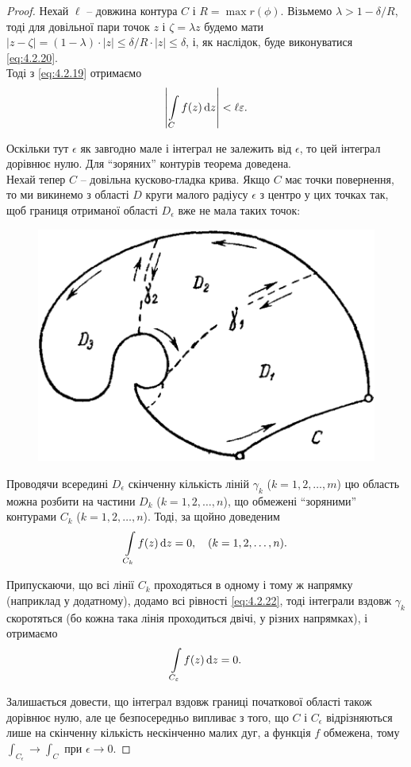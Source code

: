 \begin{proof}
	Нехай $\ell$ -- довжина контура $C$ і $R = \max r(\phi)$. Візьмемо $\lambda > 1 - \delta / R$, тоді для довільної пари точок $z$ і $\zeta = \lambda z$ будемо мати $|z - \zeta| = (1 - \lambda) \cdot |z| \le \delta / R \cdot |z| \le \delta$, і, як наслідок, буде виконуватися \eqref{eq:4.2.20}. \\

	Тоді з \eqref{eq:4.2.19} отримаємо
	\begin{equation}
		\label{eq:4.2.21}
		\left|\displaystyle\int\limits_C f(z)\mathop{}\!\mathrm{d} z\right| < \ell \varepsilon.
	\end{equation}

	Оскільки тут $\epsilon$ як завгодно мале і інтеграл не залежить від $\epsilon$, то цей інтеграл дорівнює нулю. Для ``зоряних'' контурів теорема доведена. \\

	Нехай тепер $C$ -- довільна кусково-гладка крива. Якщо $C$ має точки повернення, то ми викинемо з області $D$ круги малого радіусу $\epsilon$ з центро у цих точках так, щоб границя отриманої області $D_\epsilon$ вже не мала таких точок:
	\begin{figure}[H]
		\centering
		\includegraphics[width=.4\linewidth]{mal-20.png}
	\end{figure}

	Проводячи всередині $D_\epsilon$ скінченну кількість ліній $\gamma_k$ ($k=1,2,\ldots,m$) цю область можна розбити на частини $D_k$ ($k=1,2,\ldots,n$), що обмежені ``зоряними'' контурами $C_k$ ($k=1,2,\ldots,n$). Тоді, за щойно доведеним
	\begin{equation}
		\label{eq:4.2.22}
		\displaystyle\int\limits_{C_k} f(z) \mathop{}\!\mathrm{d} z = 0, \quad (k = 1, 2, \ldots, n).
	\end{equation}

	Припускаючи, що всі лінії $C_k$ проходяться в одному і тому ж напрямку (наприклад у додатному), додамо всі рівності \eqref{eq:4.2.22}, тоді інтеграли вздовж $\gamma_k$ скоротяться (бо кожна така лінія проходиться двічі, у різних напрямках), і отримаємо 
	\begin{equation}
		\label{eq:4.2.23}
		\displaystyle\int\limits_{C_\varepsilon} f(z) \mathop{}\!\mathrm{d} z = 0.
	\end{equation}

	Залишається довести, що інтеграл вздовж границі початкової області також дорівнює нулю, але це безпосередньо випливає з того, що $C$ і $C_\epsilon$ відрізняються лише на скінченну кількість нескінченно малих дуг, а функція $f$ обмежена, тому $\int_{C_\epsilon} \to \int_C$ при $\epsilon\to0$.
\end{proof}


